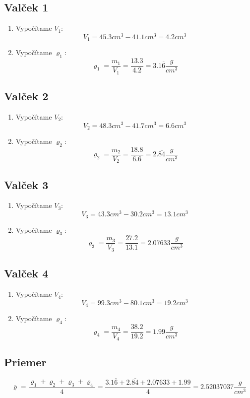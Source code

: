 \documentclass{article}
\begin{document}
\subsection{Valček 1}
\begin{enumerate}
	\item Vypočítame $V_1$:
	\[
		V_1=45.3 cm^3-41.1cm^3=4.2cm^3
	\]
	\item Vypočítame $\varrho_1$:
	\[
		\varrho_1 = \frac{m_1}{V_1} = \frac{13.3}{4.2} = 3.1\overline{6} \frac{g}{cm^3}
	\]

	\end{enumerate}
\subsection{Valček 2}
	\begin{enumerate}
	\item Vypočítame $V_2$:
	\[
		V_2=48.3 cm^3-41.7cm^3=6.6cm^3
	\]
	\item Vypočítame $\varrho_2$:
	\[
		\varrho_2 = \frac{m_2}{V_2} = \frac{18.8}{6.6} = 2.\overline{84} \frac{g}{cm^3}
	\]

	\end{enumerate}
\subsection{Valček 3}
	\begin{enumerate}
	\item Vypočítame $V_3$:
	\[
		V_3=43.3 cm^3-30.2cm^3=13.1cm^3
	\]
	\item Vypočítame $\varrho_3$:
	\[
		\varrho_3 = \frac{m_3}{V_3} = \frac{27.2}{13.1} = 2.07633 \frac{g}{cm^3}
	\]

	\end{enumerate}
\subsection{Valček 4}
\label{sec:v4}
	\begin{enumerate}
	\item Vypočítame $V_4$:
	\[
		V_4= 99.3 cm^3-80.1cm^3=19.2cm^3
	\]
	\item Vypočítame $\varrho_4$:
	\[
		\varrho_4 = \frac{m_4}{V_4} = \frac{38.2}{19.2} = 1.99 \frac{g}{cm^3}
	\]

	\end{enumerate}
\subsection{Priemer}
	\[
		\overline{ \varrho}=\frac{\varrho_1+\varrho_2+\varrho_3+\varrho_4}{4} = \frac{3.1\overline{6}+2.\overline{84}+2.07633+1.99}{4} = 2.52037037\frac{g}{cm^3}
	\]
\newpage
\end{document}
